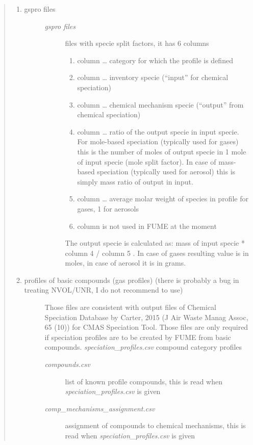 \documentclass[a4paper,11pt]{article}
\begin{document}
\begin{quote}
\begin{enumerate}
\item
  \begin{description}
  \item[gspro files]
  \begin{description}
  \item[\emph{gspro files}]
  files with specie split factors, it has 6 columns

  \begin{enumerate}
  \def\labelenumii{\arabic{enumii}.}
  \item
    column \ldots{} category for which the profile is defined
  \item
    column \ldots{} inventory specie (``input'' for chemical speciation)
  \item
    column \ldots{} chemical mechanism specie (``output'' from chemical
    speciation)
  \item
    column \ldots{} ratio of the output specie in input specie. For
    mole-based speciation (typically used for gases) this is the number
    of moles of output specie in 1 mole of input specie (mole split
    factor). In case of mass-based speciation (typically used for
    aerosol) this is simply mass ratio of output in input.
  \item
    column \ldots{} average molar weight of species in profile for
    gases, 1 for aerosols
  \item
    column is not used in FUME at the moment
  \end{enumerate}

  The output specie is calculated as: mass of input specie * column 4 /
  column 5 . In case of gases resulting value is in moles, in case of
  aerosol it is in grams.
  \end{description}
  \end{description}
\item
  \begin{description}
  \item[profiles of basic compounds (gas profiles) (there is probably a
  bug in treating NVOL/UNR, I do not recommend to use)]
  Those files are consistent with output files of Chemical Speciation
  Database by Carter, 2015 (J Air Waste Manag Assoc, 65 (10)) for CMAS
  Speciation Tool. Those files are only required if speciation profiles
  are to be created by FUME from basic compounds.
  \emph{speciation\_profiles.csv} compound category profiles

  \begin{description}
  \item[\emph{compounds.csv}]
  list of known profile compounds, this is read when
  \emph{speciation\_profiles.csv} is given
  \item[\emph{comp\_mechanisms\_assignment.csv}]
  assignment of compounds to chemical mechanisms, this is read when
  \emph{speciation\_profiles.csv} is given
  \end{description}
  \end{description}
\end{enumerate}
\end{quote}
\end{document}
